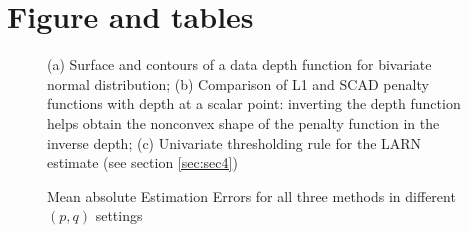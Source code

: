 \section*{Figure and tables}

\begin{figure}[htb]
\vspace{-2em}
\begin{center}
\vspace{-1em}
\caption{(a) Surface and contours of a data depth function for bivariate normal distribution; (b) Comparison of L1 and SCAD \citep{FanLi01} penalty functions with depth at a scalar point: inverting the depth function helps obtain the nonconvex shape of the penalty function in the inverse depth; (c) Univariate thresholding rule for the LARN estimate (see section \ref{sec:sec4})}
\label{fig:fig1}
\end{center}
\end{figure}

\begin{figure}[h]
\begin{center}

\caption{Mean absolute Estimation Errors for all three methods in different $(p,q)$ settings}
\label{fig:simplots}
\end{center}
\end{figure}


